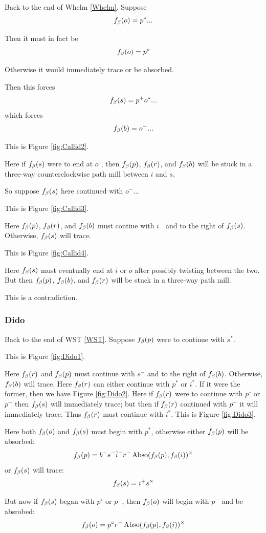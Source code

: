 Back to the end of Whelm \ref{Whelm}. Suppose
$$f_\beta(o) = p^*...$$

Then it must in fact be
$$f_\beta(o) = p^\circ$$

Otherwise it would immediately trace or be absorbed.

Then this forces
$$f_\beta(s) = p^+ o^*...$$
which forces
$$f_\beta(b) = o^-...$$

This is Figure \ref{fig:Callid2}.

Here if $f_\beta(s)$ were to end at $o^\circ$, then $f_\beta(p)$, $f_\beta(r)$, and $f_\beta(b)$ will be stuck in a three-way counterclockwise path mill between $i$ and $s$.

So suppose $f_\beta(s)$ here continued with $o^-...$

This is Figure \ref{fig:Callid3}.

Here $f_\beta(p)$, $f_\beta(r)$, and $f_\beta(b)$ must contiue with $i^-$ and to the right of $f_\beta(s)$. Otherwise, $f_\beta(s)$ will trace. 

This is Figure \ref{fig:Callid4}.

Here $f_\beta(s)$ must eventually end at $i$ or $o$ after possibly twisting between the two. But then $f_\beta(p)$, $f_\beta(b)$, and $f_\beta(r)$ will be stuck in a three-way path mill.

This is a contradiction.

\subsubsection{Dido}
Back to the end of WST \ref{WST}. Suppose $f_\beta(p)$ were to continue with $s^*$. 

This is Figure \ref{fig:Dido1}.

Here $f_\beta(r)$ and $f_\beta(p)$ must continue with $s^-$ and to the right of $f_\beta(b)$. Otherwise, $f_\beta(b)$ will trace. Here $f_\beta(r)$ can either continue with $p^*$ or $i^*$. If it were the former, then we have Figure \ref{fig:Dido2}. Here if $f_\beta(r)$ were to continue with $p^\circ$ or $p^+$ then $f_\beta(s)$ will immediately trace; but then if $f_\beta(r)$ continued with $p^-$ it will immediately trace. Thus $f_\beta(r)$ must continue with $i^*$. This is Figure \ref{fig:Dido3}.

Here both $f_\beta(o)$ and $f_\beta(s)$ must begin with $p^*$, otherwise either $f_\beta(p)$ will be absorbed:
$$f_\beta(p) = b^- s^- \hat{i}^- r^- \operatorname{Abso}(f_\beta(p), f_\beta(i))^\times$$
or $f_\beta(s)$ will trace:
$$f_\beta(s) = i^+ s^\times$$

But now if $f_\beta(s)$ began with $p^\circ$ or $p^-$, then $f_\beta(o)$ will begin with $p^-$ and be absrobed:
$$f_\beta(o) = p^\circ r^- \operatorname{Abso}(f_\beta(p), f_\beta(i))^\times$$

